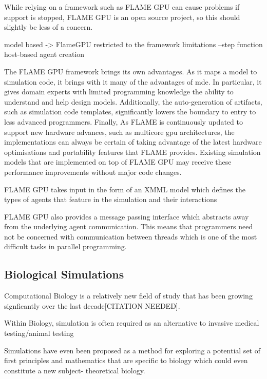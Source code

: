 \documentclass{UoYCSproject}
\begin{document}
While relying on a framework such as \gls{FLAME GPU} can cause problems if support is stopped, \gls{FLAME GPU} is an open source project, so this should slightly be less of a concern.

model based -> FlameGPU\cite{flame_keratinocyte}
	restricted to the framework limitations
	--step function host-based agent creation

The \gls{FLAME GPU} framework brings its own advantages.
As it maps a model to simulation code, it brings with it many of the advantages of \acrlong{mde}.
In particular, it gives domain experts with limited programming knowledge the ability to understand and help design models.
Additionally, the auto-generation of artifacts, such as simulation code templates, significantly lowers the boundary to entry to less advanced programmers.
Finally, As FLAME is continuously updated to support new hardware advances, such as multicore \acrshort{gpu} architectures\cite{flame_simulation}, the implementations can always be certain of taking advantage of the latest hardware optimisations and portability features that FLAME provides. Existing simulation models that are implemented on top of \gls{FLAME GPU} may receive these performance improvements without major code changes.

\gls{FLAME GPU} takes input in the form of an XMML model which defines the types of agents that feature in the simulation and their interactions%

\gls{FLAME GPU} also provides a message passing interface which abstracts away from the underlying agent communication.
This means that programmers need not be concerned with communication between threads which is one of the most difficult tasks in parallel programming.

\subsection{Biological Simulations}
Computational Biology is a relatively new field of study that has been growing signficantly over the last decade[CITATION NEEDED].

Within Biology, simulation is often required as an alternative to invasive medical testing/animal testing


Simulations have even been proposed as a method for exploring a potential set of first principles and mathematics that are specific to biology which could even constitute a new subject- theoretical biology\cite{rise_article}.
\end{document}
